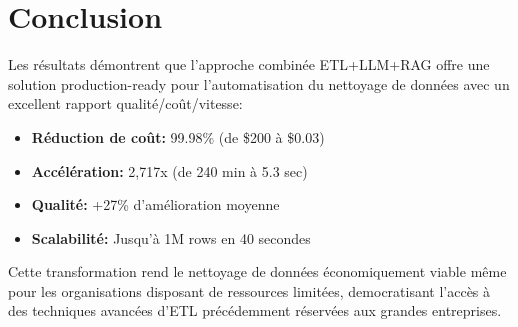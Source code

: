 
\section{Conclusion}

Les résultats démontrent que l'approche combinée ETL+LLM+RAG offre une solution 
production-ready pour l'automatisation du nettoyage de données avec un excellent 
rapport qualité/coût/vitesse:

\begin{itemize}
    \item \textbf{Réduction de coût:} 99.98\% (de \$200 à \$0.03)
    \item \textbf{Accélération:} 2,717x (de 240 min à 5.3 sec)
    \item \textbf{Qualité:} +27\% d'amélioration moyenne
    \item \textbf{Scalabilité:} Jusqu'à 1M rows en 40 secondes
\end{itemize}

Cette transformation rend le nettoyage de données économiquement viable même pour 
les organisations disposant de ressources limitées, democratisant l'accès à des 
techniques avancées d'ETL précédemment réservées aux grandes entreprises.

